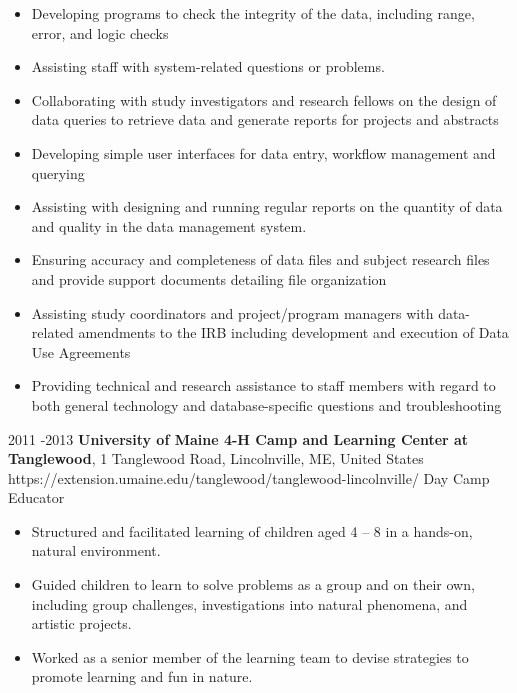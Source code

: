 \documentclass[10pt]{article} %
\begin{document}
{\begin{itemize}
\item Developing programs to check the integrity of the data, including range, error, and logic checks
\item Assisting staff with system-related questions or problems.
\item Collaborating with study investigators and research fellows on the design of data queries to retrieve data and generate reports for projects and abstracts
\item Developing simple user interfaces for data entry, workflow management and querying
\item Assisting with designing and running regular reports on the quantity of data and quality in the data management system.
\item Ensuring accuracy and completeness of data files and subject research files and provide support documents detailing file organization 
\item Assisting study coordinators and project/program managers with data-related amendments to the IRB including development and execution of Data Use Agreements
\item Providing technical and research assistance to staff members with regard to both general technology and database-specific questions and troubleshooting
\end{itemize}
}


\job
{2011 -}{2013}
{\textbf{University of Maine 4-H Camp and Learning Center at Tanglewood}, 1 Tanglewood Road, Lincolnville, ME, United States}
{https://extension.umaine.edu/tanglewood/tanglewood-lincolnville/}
{Day Camp Educator}
{
\begin{itemize}
\item Structured and facilitated learning of children aged 4 – 8 in a hands-on, natural environment.
\item Guided children to learn to solve problems as a group and on their own, including group challenges, investigations into natural phenomena, and artistic projects.
\item Worked as a senior member of the learning team to devise strategies to promote learning and fun in nature.
\end{itemize}
}

\end{document}
